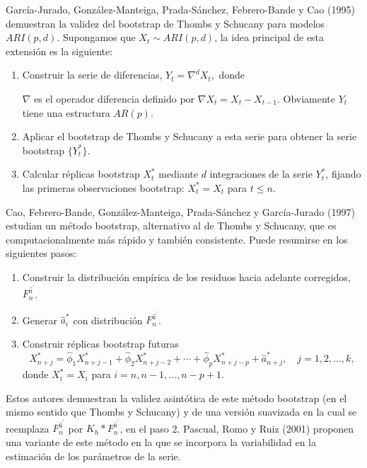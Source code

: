\documentclass[]{book}
\theoremstyle{break}
\theoremstyle{definition}
\theoremstyle{definition}
\theoremstyle{definition}
\theoremstyle{remark}
\begin{document}
García-Jurado, González-Manteiga, Prada-Sánchez, Febrero-Bande y Cao
(1995) demuestran la validez del bootstrap de Thombs y Schucany para
modelos \(ARI(p,d)\). Supongamos que \(X_{t}\sim ARI(p,d)\), la idea
principal de esta extensión es la siguiente:

\begin{enumerate}
\def\labelenumi{\arabic{enumi}.}
\item
  Construir la serie de diferencias, \(Y_{t}=\nabla^{d}X_{t},\) donde

  \(\nabla\) es el operador diferencia definido por
  \(\nabla X_{t}=X_{t}-X_{t-1}\). Obviamente \(Y_{t}\) tiene una
  estructura \(AR(p)\).
\item
  Aplicar el bootstrap de Thombs y Schucany a esta serie para obtener la
  serie bootstrap \(\{Y_{t}^{\ast}\}\).
\item
  Calcular réplicas bootstrap \(X_{t}^{\ast}\) mediante \(d\)
  integraciones de la serie \(Y_{t}^{\ast}\), fijando las primeras
  observaciones bootstrap: \(X_{t}^{\ast}=X_{t}\) para \(t\leq n\).
\end{enumerate}

Cao, Febrero-Bande, González-Manteiga, Prada-Sánchez y García-Jurado
(1997) estudian un método bootstrap, alternativo al de Thombs y
Schucany, que es computacionalmente más rápido y también consistente.
Puede resumirse en los siguientes pasos:

\begin{enumerate}
\def\labelenumi{\arabic{enumi}.}
\item
  Construir la distribución empírica de los residuos hacia adelante
  corregidos, \(F_n^{\widehat{a}^{\prime}}\).
\item
  Generar \(\widehat{a}_i^{\ast}\) con distribución
  \(F_n^{ \widehat{a}^{\prime}}\).
\item
  Construir réplicas bootstrap futuras
  \[X_{n+j}^{\ast}=\widehat{\phi}_1X_{n+j-1}^{\ast}
  +\widehat{\phi}_2X_{n+j-2}^{\ast} + \cdots +\widehat{\phi}_{p}X_{n+j-p}^{\ast}
  +\widehat{a}_{n+j}^{\ast},\quad j=1,2,\ldots ,k,\] donde
  \(X_i^{\ast}=X_i\) para \(i=n,n-1,\ldots ,n-p+1.\)
\end{enumerate}

Estos autores demuestran la validez asintótica de este método bootstrap
(en el mismo sentido que Thombs y Schucany) y de una versión suavizada
en la cual se reemplaza \(F_n^{\widehat{a}^{\prime}}\) por
\(K_{h}\ast F_n^{\widehat{a}^{\prime}}\), en el paso 2. Pascual, Romo y
Ruiz (2001) proponen una variante de este método en la que se incorpora
la variabilidad en la estimación de los parámetros de la serie.
\end{document}

